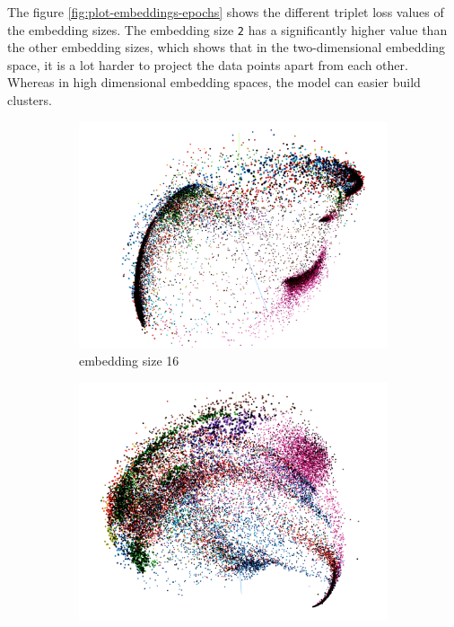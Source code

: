 \newline
\newline
The figure \ref{fig:plot-embeddings-epochs} shows the different triplet loss values of the embedding sizes. The embedding size \texttt{2} has a significantly higher value than the other embedding sizes, which shows that in the two-dimensional embedding space, it is a lot harder to project the data points apart from each other. Whereas in high dimensional embedding spaces, the model can easier build clusters.
\begin{figure}[t]
\centering
\begin{subfigure}{.33\linewidth}
  \centering
  \includegraphics[width=.9\linewidth]{study-doc/experiment_embedding_size/assets/embedding_space_16.png}
  \caption{embedding size 16}
  \label{fig:embedding-space-16}
\end{subfigure}%
\begin{subfigure}{.33\linewidth}
  \centering
  \includegraphics[width=.9\linewidth]{study-doc/experiment_embedding_size/assets/embedding_space_32.png}

\end{subfigure}
\end{figure}
